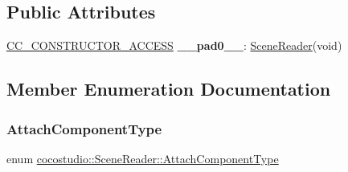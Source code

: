 \subsection*{Public Attributes}
\begin{DoxyCompactItemize}
\item 
\mbox{\label{classcocostudio_1_1SceneReader_ac624f7551cc6c3f66fb58cb3c6150d78}} 
\hyperlink{_2cocos2d_2cocos_2base_2ccConfig_8h_a25ef1314f97c35a2ed3d029b0ead6da0}{C\+C\+\_\+\+C\+O\+N\+S\+T\+R\+U\+C\+T\+O\+R\+\_\+\+A\+C\+C\+E\+SS} {\bfseries \+\_\+\+\_\+pad0\+\_\+\+\_\+}\+: \hyperlink{classcocostudio_1_1SceneReader}{Scene\+Reader}(void)
\end{DoxyCompactItemize}


\subsection{Member Enumeration Documentation}
\mbox{\label{classcocostudio_1_1SceneReader_ae79446a46e4d2fecfe754382fc2ec24a}} 
\subsubsection{\texorpdfstring{Attach\+Component\+Type}{AttachComponentType}\hspace{0.1cm}{\footnotesize\ttfamily [1/2]}}
{\footnotesize\ttfamily enum \hyperlink{classcocostudio_1_1SceneReader_ae79446a46e4d2fecfe754382fc2ec24a}{cocostudio\+::\+Scene\+Reader\+::\+Attach\+Component\+Type}\hspace{0.3cm}{\ttfamily [strong]}}

